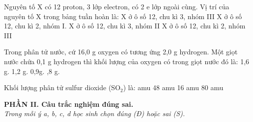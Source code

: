 \documentclass[11pt,a4paper]{article}
\begin{document}
\begin{ex}
Nguyên tố X có 12 proton, 3 lớp electron, có 2 e lớp ngoài cùng. Vị trí của nguyên tố X trong bảng tuần hoàn là:
\choice
{X ở ô số 12, chu kì 3, nhóm III}
{X ở ô số 12, chu kì 2, nhóm I.}
{\True X ở ô số 12, chu kì 3, nhóm II}
{X ở ô số 12, chu kì 2, nhóm III}
\end{ex}

\begin{ex}
Trong phân tử nước, cứ 16,0 g oxygen có tương ứng 2,0 g hydrogen. Một giọt nước chứa 0,1 g hydrogen thì khối lượng của oxygen có trong giọt nước đó là:
\choice
{1,6 g.}
{1,2 g.}
{0,9g.}
{,8 g.}
\end{ex}

\begin{ex}
Khối lượng phân tử sulfur dioxide (SO$_{2}$) là:
\choice
{ amu}
{48 amu}
{16 amu}
{80 amu}
\end{ex}


\vspace{4pt}
\noindent
\textbf{\color{mainGreen}PHẦN II. Câu trắc nghiệm đúng sai.}\\
\textit{Trong mỗi ý a, b, c, d học sinh chọn đúng (Đ) hoặc sai (S).}

\setcounter{ex}{0}
\end{document}
